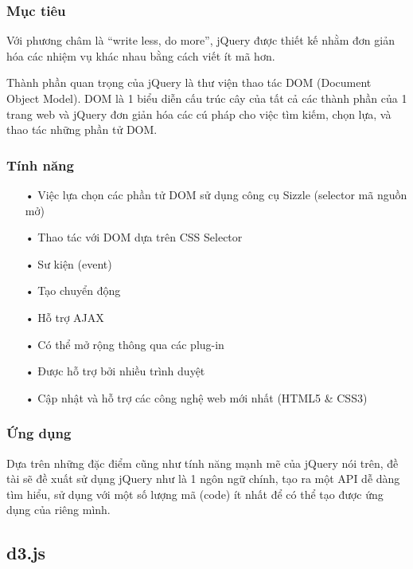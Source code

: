 \documentclass[12pt,a4paper]{article}
\begin{document}
\subsubsection{Mục tiêu}
Với phương châm là “write less, do more”, jQuery được thiết kế nhằm đơn giản hóa các nhiệm vụ khác nhau bằng cách viết ít mã hơn. 

Thành phần quan trọng của jQuery là thư viện thao tác DOM (Document Object Model). DOM là 1 biểu diễn cấu trúc cây của tất cả các thành phần của 1 trang web và jQuery đơn giản hóa các cú pháp cho việc tìm kiếm, chọn lựa, và thao tác những phần tử DOM.

\subsubsection{Tính năng}
\begin{itemize}
\item[•] Việc lựa chọn các phần tử DOM sử dụng công cụ Sizzle (selector mã nguồn mở)\cite{sizzle}

\item[•] Thao tác với DOM dựa trên CSS Selector

\item[•] Sư kiện (event)

\item[•] Tạo chuyển động

\item[•] Hỗ trợ AJAX

\item[•] Có thể mở rộng thông qua các plug-in

\item[•] Được hỗ trợ bởi nhiều trình duyệt

\item[•] Cập nhật và hỗ trợ các công nghệ web mới nhất (HTML5 \& CSS3)
\end{itemize}

\subsubsection{Ứng dụng}
Dựa trên những đặc điểm cũng như tính năng mạnh mẽ của jQuery nói trên, đề tài sẽ đề xuất sử dụng jQuery như là 1 ngôn ngữ chính, tạo ra một API dễ dàng tìm hiểu, sử dụng với một số lượng mã (code) ít nhất để có thể tạo được ứng dụng của riêng mình.

\subsection{d3.js}
\end{document}
